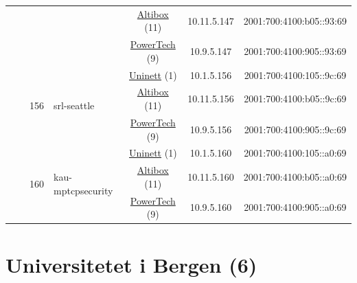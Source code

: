 \begin{small}
\begin{center}
\begin{longtable}{|c|c|c|c|c|c|c|c|}
  &  &  &  & \multicolumn{2}{|c|}{\tiny{\href{https://www.altibox.no}{Altibox} (11)}} & \tiny{10.11.5.147} & \tiny{2001:700:4100:b05::93:69} \\* \cline{5-5}\cline{6-6}\cline{7-7}\cline{8-8}
  &  &  &  & \multicolumn{2}{|c|}{\tiny{\href{http://www.powertech.no}{PowerTech} (9)}} & \tiny{10.9.5.147} & \tiny{2001:700:4100:905::93:69} \\* \cline{3-3}\cline{4-4}\cline{5-5}\cline{6-6}\cline{7-7}\cline{8-8}
  &  & \multirow{3}{*}{\tiny{156}} & \multicolumn{1}{|l|}{\multirow{3}{*}{\tiny{srl-seattle}}} & \multicolumn{2}{|c|}{\tiny{\href{https://www.uninett.no}{Uninett} (1)}} & \tiny{10.1.5.156} & \tiny{2001:700:4100:105::9c:69} \\* \cline{5-5}\cline{6-6}\cline{7-7}\cline{8-8}
  &  &  &  & \multicolumn{2}{|c|}{\tiny{\href{https://www.altibox.no}{Altibox} (11)}} & \tiny{10.11.5.156} & \tiny{2001:700:4100:b05::9c:69} \\* \cline{5-5}\cline{6-6}\cline{7-7}\cline{8-8}
  &  &  &  & \multicolumn{2}{|c|}{\tiny{\href{http://www.powertech.no}{PowerTech} (9)}} & \tiny{10.9.5.156} & \tiny{2001:700:4100:905::9c:69} \\* \cline{3-3}\cline{4-4}\cline{5-5}\cline{6-6}\cline{7-7}\cline{8-8}
  &  & \multirow{3}{*}{\tiny{160}} & \multicolumn{1}{|l|}{\multirow{3}{*}{\tiny{kau-mptcpsecurity}}} & \multicolumn{2}{|c|}{\tiny{\href{https://www.uninett.no}{Uninett} (1)}} & \tiny{10.1.5.160} & \tiny{2001:700:4100:105::a0:69} \\* \cline{5-5}\cline{6-6}\cline{7-7}\cline{8-8}
  &  &  &  & \multicolumn{2}{|c|}{\tiny{\href{https://www.altibox.no}{Altibox} (11)}} & \tiny{10.11.5.160} & \tiny{2001:700:4100:b05::a0:69} \\* \cline{5-5}\cline{6-6}\cline{7-7}\cline{8-8}
  &  &  &  & \multicolumn{2}{|c|}{\tiny{\href{http://www.powertech.no}{PowerTech} (9)}} & \tiny{10.9.5.160} & \tiny{2001:700:4100:905::a0:69} \\ \hline
\end{longtable}
\end{center}
\end{small}



\section{Universitetet i Bergen (6)}
\label{sec:UiB}

